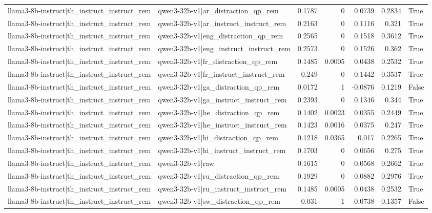 \begin{table}
\begin{tabular}{l l r r r r l}
llama3-8b-instruct|th_instruct_instruct_rem & qwen3-32b-v1|ar_distraction_qp_rem & 0.1787 & 0 & 0.0739 & 0.2834 & True \\
llama3-8b-instruct|th_instruct_instruct_rem & qwen3-32b-v1|ar_instruct_instruct_rem & 0.2163 & 0 & 0.1116 & 0.321 & True \\
llama3-8b-instruct|th_instruct_instruct_rem & qwen3-32b-v1|eng_distraction_qp_rem & 0.2565 & 0 & 0.1518 & 0.3612 & True \\
llama3-8b-instruct|th_instruct_instruct_rem & qwen3-32b-v1|eng_instruct_instruct_rem & 0.2573 & 0 & 0.1526 & 0.362 & True \\
llama3-8b-instruct|th_instruct_instruct_rem & qwen3-32b-v1|fr_distraction_qp_rem & 0.1485 & 0.0005 & 0.0438 & 0.2532 & True \\
llama3-8b-instruct|th_instruct_instruct_rem & qwen3-32b-v1|fr_instruct_instruct_rem & 0.249 & 0 & 0.1442 & 0.3537 & True \\
llama3-8b-instruct|th_instruct_instruct_rem & qwen3-32b-v1|ga_distraction_qp_rem & 0.0172 & 1 & -0.0876 & 0.1219 & False \\
llama3-8b-instruct|th_instruct_instruct_rem & qwen3-32b-v1|ga_instruct_instruct_rem & 0.2393 & 0 & 0.1346 & 0.344 & True \\
llama3-8b-instruct|th_instruct_instruct_rem & qwen3-32b-v1|he_distraction_qp_rem & 0.1402 & 0.0023 & 0.0355 & 0.2449 & True \\
llama3-8b-instruct|th_instruct_instruct_rem & qwen3-32b-v1|he_instruct_instruct_rem & 0.1423 & 0.0016 & 0.0375 & 0.247 & True \\
llama3-8b-instruct|th_instruct_instruct_rem & qwen3-32b-v1|hi_distraction_qp_rem & 0.1218 & 0.0365 & 0.017 & 0.2265 & True \\
llama3-8b-instruct|th_instruct_instruct_rem & qwen3-32b-v1|hi_instruct_instruct_rem & 0.1703 & 0 & 0.0656 & 0.275 & True \\
llama3-8b-instruct|th_instruct_instruct_rem & qwen3-32b-v1|raw & 0.1615 & 0 & 0.0568 & 0.2662 & True \\
llama3-8b-instruct|th_instruct_instruct_rem & qwen3-32b-v1|ru_distraction_qp_rem & 0.1929 & 0 & 0.0882 & 0.2976 & True \\
llama3-8b-instruct|th_instruct_instruct_rem & qwen3-32b-v1|ru_instruct_instruct_rem & 0.1485 & 0.0005 & 0.0438 & 0.2532 & True \\
llama3-8b-instruct|th_instruct_instruct_rem & qwen3-32b-v1|sw_distraction_qp_rem & 0.031 & 1 & -0.0738 & 0.1357 & False \\

\end{tabular}
\end{table}
